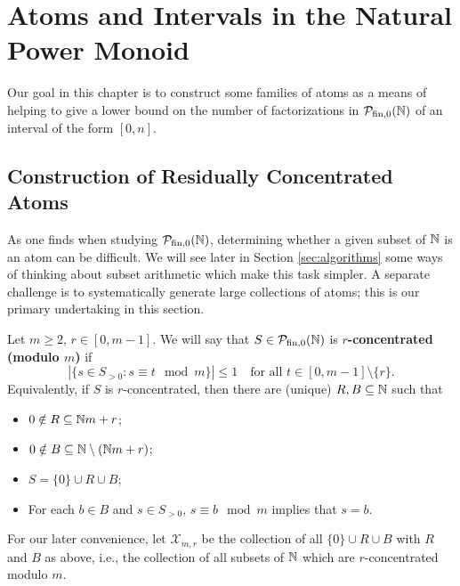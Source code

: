 \chapter{Atoms and Intervals in the Natural Power Monoid}

Our goal in this chapter is to construct some families of atoms as a means of helping to give a lower bound on the number of factorizations in ${\mathcal{P}_{\textrm{fin},0}(\mathbb{N})}$ of an interval of the form $[0,n]$.


\section{Construction of Residually Concentrated Atoms}

As one finds when studying ${\mathcal{P}_{\textrm{fin},0}(\mathbb{N})}$, determining whether a given subset of $\mathbb{N}$ is an atom can be difficult.
We will see later in Section \ref{sec:algorithms} some ways of thinking about subset arithmetic which make this task simpler.
A separate challenge is to systematically generate large collections of atoms; this is our primary undertaking in this section.

\begin{defn} \label{def:resid concentrated}
Let $m\ge 2$, $r\in [0,m-1]$.
We will say that $S\in {\mathcal{P}_{\textrm{fin},0}(\mathbb{N})}$ is \textbf{$r$-concentrated (modulo $m$)} if
\[|\{s\in S_{>0}: s\equiv t \mod m\}|\le 1 \quad \textrm{for all $t\in [0,m-1]\setminus\{r\}$.}  \tag{$*$}\]
Equivalently, if $S$ is $r$-concentrated, then there are (unique) $R,B\subseteq \mathbb{N}$ such that
\begin{itemize}
	\item $0\notin R \subseteq \mathbb{N} m + r$;
	\item $0\notin B \subseteq \mathbb{N} \setminus (\mathbb{N} m + r)$;
	\item $S = \{0\} \cup R \cup B$;
	\item For each $b\in B$ and $s\in S_{>0}$, $s\equiv b \mod m$ implies that $s = b$.
\end{itemize}

For our later convenience, let $\mathcal{X}_{m,r}$ be the collection of all $\{0\}\cup R \cup B$ with $R$ and $B$ as above, i.e., the collection of all subsets of $\mathbb{N}$ which are $r$-concentrated modulo $m$.
\end{defn}

